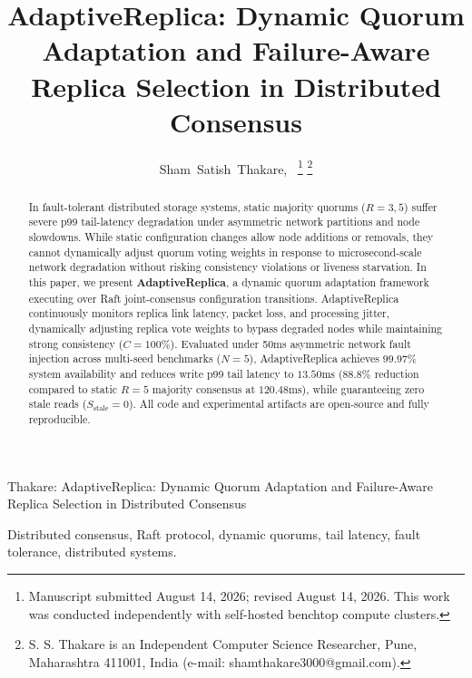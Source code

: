 \documentclass[journal]{IEEEtran}
\begin{document}
\title{AdaptiveReplica: Dynamic Quorum Adaptation and Failure-Aware Replica Selection in Distributed Consensus}

\author{Sham~Satish~Thakare,~%
\thanks{Manuscript submitted August 14, 2026; revised August 14, 2026. This work was conducted independently with self-hosted benchtop compute clusters.}%
\thanks{S. S. Thakare is an Independent Computer Science Researcher, Pune, Maharashtra 411001, India (e-mail: shamthakare3000@gmail.com).}%
}

%
{Thakare: AdaptiveReplica: Dynamic Quorum Adaptation and Failure-Aware Replica Selection in Distributed Consensus}

\maketitle

\begin{abstract}
In fault-tolerant distributed storage systems, static majority quorums ($R = 3, 5$) suffer severe p99 tail-latency degradation under asymmetric network partitions and node slowdowns. While static configuration changes allow node additions or removals, they cannot dynamically adjust quorum voting weights in response to microsecond-scale network degradation without risking consistency violations or liveness starvation. In this paper, we present \textbf{AdaptiveReplica}, a dynamic quorum adaptation framework executing over Raft joint-consensus configuration transitions. AdaptiveReplica continuously monitors replica link latency, packet loss, and processing jitter, dynamically adjusting replica vote weights to bypass degraded nodes while maintaining strong consistency ($C = 100\%$). Evaluated under 50ms asymmetric network fault injection across multi-seed benchmarks ($N = 5$), AdaptiveReplica achieves $99.97\%$ system availability and reduces write p99 tail latency to $13.50\text{ms}$ ($88.8\%$ reduction compared to static $R=5$ majority consensus at $120.48\text{ms}$), while guaranteeing zero stale reads ($S_{\text{stale}} = 0$). All code and experimental artifacts are open-source and fully reproducible.
\end{abstract}

\begin{IEEEkeywords}
Distributed consensus, Raft protocol, dynamic quorums, tail latency, fault tolerance, distributed systems.
\end{IEEEkeywords}
\end{document}
